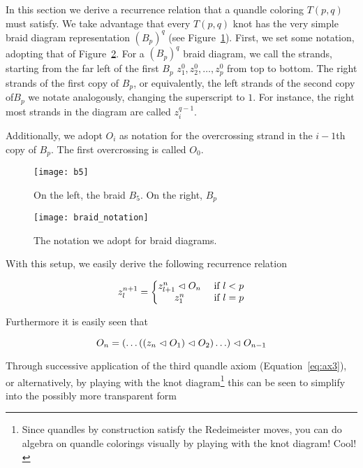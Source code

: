 \documentclass[paper.tex]{subfiles}
\begin{document}
In this section we derive a recurrence relation that a quandle coloring $T(p,q)$ must satisfy. We take advantage that every $T(p,q)$ knot has the very simple braid diagram representation $(B_p)^q$ (see Figure~\ref{fig:bp}). First,
we set some notation, adopting that of Figure~\ref{fig:braid_notation}. For a $(B_p)^q$ braid diagram, we call the strands, starting from the far left of the first $B_p$ $z^0_1, z^0_2, \ldots, z^0_p$ from top to bottom.
The right strands of the first copy of $B_p$, or equivalently, the left strands of the second copy of$B_p$ we notate analogously, changing the superscript to $1$. For instance, the right most strands in the diagram are called $z^{q - 1}_i$.

Additionally, we adopt $O_i$ as notation for the overcrossing strand in the $i - 1$th copy of $B_p$. The first overcrossing is called $O_0$.

\begin{figure}[h]
  \centering
  \texttt{[image: b5]}
  \caption{On the left, the braid $B_5$. On the right, $B_p$}\label{fig:bp}
\end{figure}

\begin{figure}[h]
   \centering
   \texttt{[image: braid\_notation]}
   \caption{The notation we adopt for braid diagrams.}\label{fig:braid_notation}
\end{figure}

With this setup, we easily derive the following recurrence relation

\begin{equation}
   \label{eq:pq_recurrence}
   z^{n+1}_l = \left\{
   \begin{matrix}
        z^n_{l+1} \vartriangleleft O_n &\text{ if } l < p \\
        z^n_1 &\text{ if } l = p
   \end{matrix}
   \right.
\end{equation}

Furthermore it is easily seen that

\begin{equation}
   O_n = (\ldots((z_n \vartriangleleft O_1) \vartriangleleft O_2) \ldots ) \vartriangleleft O_{n-1}
\end{equation}

Through successive application of the third quandle axiom (Equation~\ref{eq:ax3}), or alternatively, by playing with the knot diagram\footnote{Since quandles by construction satisfy the Redeimeister moves, you can do algebra
        on quandle colorings visually by playing with the knot diagram! Cool!} this can be seen to simplify into the possibly more transparent form
\end{document}
